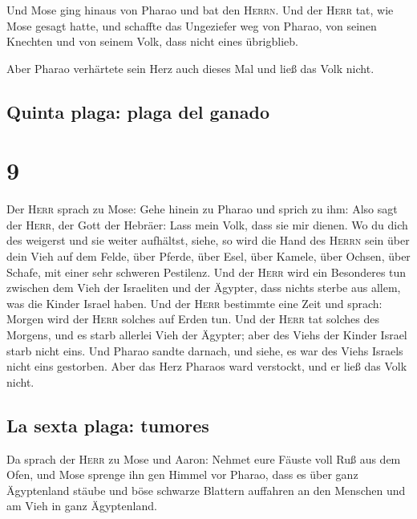  Und Mose ging hinaus von Pharao und bat den
\textsc{Herrn}.  Und der \textsc{Herr} tat, wie Mose
gesagt hatte, und schaffte das Ungeziefer weg von Pharao, von seinen
Knechten und von seinem Volk, dass nicht eines übrigblieb.

 Aber Pharao verhärtete sein Herz auch dieses Mal und
ließ das Volk nicht.

\hypertarget{quinta-plaga-plaga-del-ganado}{%
\subsection{Quinta plaga: plaga del
ganado}\label{quinta-plaga-plaga-del-ganado}}

\hypertarget{section-8}{%
\section{9}\label{section-8}}

 Der \textsc{Herr} sprach zu Mose: Gehe hinein zu Pharao
und sprich zu ihm: Also sagt der \textsc{Herr}, der Gott der Hebräer:
Lass mein Volk, dass sie mir dienen.  Wo du dich des
weigerst und sie weiter aufhältst,  siehe, so wird die
Hand des \textsc{Herrn} sein über dein Vieh auf dem Felde, über Pferde,
über Esel, über Kamele, über Ochsen, über Schafe, mit einer sehr
schweren Pestilenz.  Und der \textsc{Herr} wird ein
Besonderes tun zwischen dem Vieh der Israeliten und der Ägypter, dass
nichts sterbe aus allem, was die Kinder Israel haben.  Und
der \textsc{Herr} bestimmte eine Zeit und sprach: Morgen wird der
\textsc{Herr} solches auf Erden tun.  Und der
\textsc{Herr} tat solches des Morgens, und es starb allerlei Vieh der
Ägypter; aber des Viehs der Kinder Israel starb nicht eins.
 Und Pharao sandte darnach, und siehe, es war des Viehs
Israels nicht eins gestorben. Aber das Herz Pharaos ward verstockt, und
er ließ das Volk nicht.

\hypertarget{la-sexta-plaga-tumores}{%
\subsection{La sexta plaga: tumores}\label{la-sexta-plaga-tumores}}

 Da sprach der \textsc{Herr} zu Mose und Aaron: Nehmet
eure Fäuste voll Ruß aus dem Ofen, und Mose sprenge ihn gen Himmel vor
Pharao,  dass es über ganz Ägyptenland stäube und böse
schwarze Blattern auffahren an den Menschen und am Vieh in ganz
Ägyptenland.

